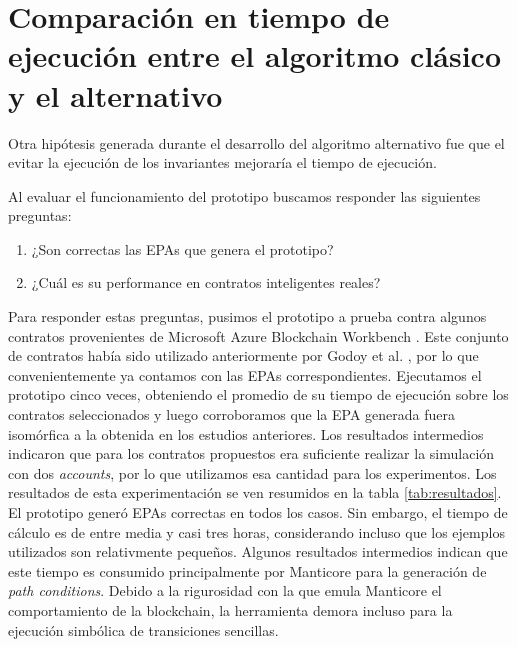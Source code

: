 \section{Comparación en tiempo de ejecución entre el algoritmo clásico y el alternativo}
Otra hipótesis generada durante el desarrollo del algoritmo alternativo fue que el evitar la ejecución de los invariantes mejoraría el tiempo de ejecución.

Al evaluar el funcionamiento del prototipo buscamos responder las siguientes preguntas:
\begin{enumerate}
    \item ¿Son correctas las EPAs que genera el prototipo?
    \item ¿Cuál es su performance en contratos inteligentes reales?
\end{enumerate}
Para responder estas preguntas, pusimos el prototipo a prueba contra algunos contratos provenientes de Microsoft Azure Blockchain Workbench \cite{azure-benchmark}.
Este conjunto de contratos había sido utilizado anteriormente por Godoy et al. \cite{predicate-abstraction-for-smart-contract-validation}, por lo que convenientemente ya contamos con las EPAs correspondientes.
Ejecutamos el prototipo cinco veces, obteniendo el promedio de su tiempo de ejecución sobre los contratos seleccionados y luego corroboramos que la EPA generada fuera isomórfica a la obtenida en los estudios anteriores.
Los resultados intermedios indicaron que para los contratos propuestos era suficiente realizar la simulación con dos \textit{accounts}, por lo que utilizamos esa cantidad para los experimentos.
Los resultados de esta experimentación se ven resumidos en la tabla \ref{tab:resultados}.
El prototipo generó EPAs correctas en todos los casos.
Sin embargo, el tiempo de cálculo es de entre media y casi tres horas, considerando incluso que los ejemplos utilizados son relativmente pequeños.
Algunos resultados intermedios indican que este tiempo es consumido principalmente por Manticore para la generación de \textit{path conditions}.
Debido a la rigurosidad con la que emula Manticore el comportamiento de la blockchain, la herramienta demora incluso para la ejecución simbólica de transiciones sencillas.

\vspace{-2.2em}

